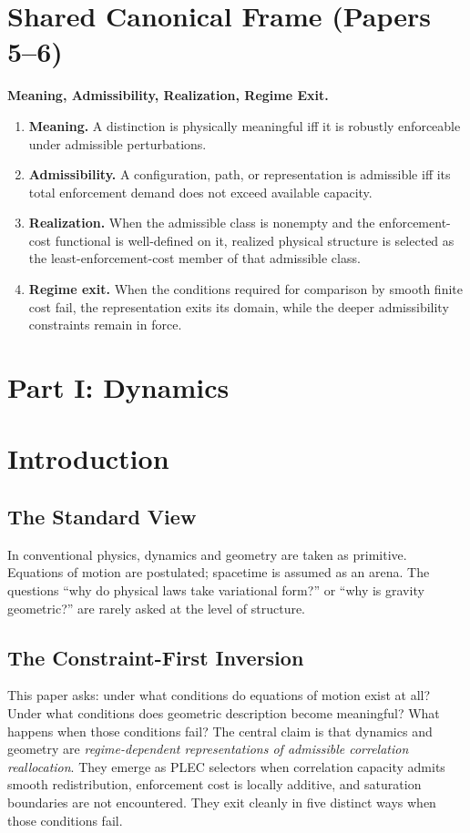 \documentclass[11pt]{article}
\begin{document}
\section*{Shared Canonical Frame (Papers 5--6)}

\begin{apfbox}
\textbf{Meaning, Admissibility, Realization, Regime Exit.}
\begin{enumerate}[leftmargin=1.6em]
    \item \textbf{Meaning.} A distinction is physically meaningful iff it is
    robustly enforceable under admissible perturbations.
    \item \textbf{Admissibility.} A configuration, path, or representation is
    admissible iff its total enforcement demand does not exceed available capacity.
    \item \textbf{Realization.} When the admissible class is nonempty and the
    enforcement-cost functional is well-defined on it, realized physical structure
    is selected as the least-enforcement-cost member of that admissible class.
    \item \textbf{Regime exit.} When the conditions required for comparison by
    smooth finite cost fail, the representation exits its domain, while the deeper
    admissibility constraints remain in force.
\end{enumerate}
\end{apfbox}

\section*{Part I: Dynamics}

\section{Introduction}

\subsection{The Standard View}
In conventional physics, dynamics and geometry are taken as primitive. Equations
of motion are postulated; spacetime is assumed as an arena. The questions ``why
do physical laws take variational form?'' or ``why is gravity geometric?'' are
rarely asked at the level of structure.

\subsection{The Constraint-First Inversion}
This paper asks: under what conditions do equations of motion exist at all? Under
what conditions does geometric description become meaningful? What happens when
those conditions fail? The central claim is that dynamics and geometry are
\emph{regime-dependent representations of admissible correlation reallocation}.
They emerge as PLEC selectors when correlation capacity admits smooth
redistribution, enforcement cost is locally additive, and saturation boundaries
are not encountered. They exit cleanly in five distinct ways when those
conditions fail.
\end{document}

